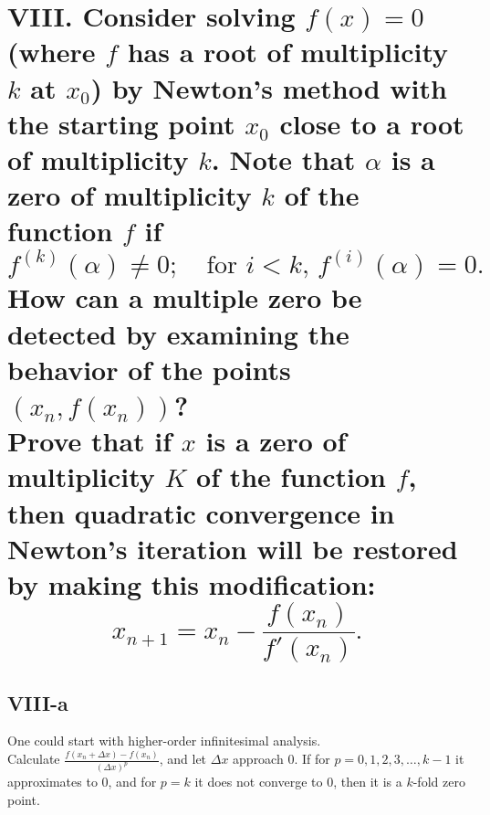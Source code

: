 \documentclass[a4paper]{article}
\begin{document}
\section*{VIII. Consider solving \( f(x) = 0 \) (where \( f \) has a root of multiplicity \( k \) at \( x_0 \)) by Newton's method with the starting point \( x_0 \) close to a root of multiplicity \( k \). Note that \( \alpha \) is a zero of multiplicity \( k \) of the function \( f \) if
\[
f^{(k)}(\alpha) \neq 0; \quad \text{for } i < k, \, f^{(i)}(\alpha) = 0.
\]
How can a multiple zero be detected by examining the behavior of the points \( (x_n, f(x_n)) \)?
\\
Prove that if \( x \) is a zero of multiplicity \( K \) of the function \( f \), then quadratic convergence in Newton's iteration will be restored by making this modification:
\[
x_{n+1} = x_n - \frac{f(x_n)}{f'(x_n)}.
\]
}

\subsection*{VIII-a}
One could start with higher-order infinitesimal analysis.\\
Calculate \( \frac{f(x_n + \Delta x)-f(x_n)}{(\Delta x)^p} \), and let \( \Delta x \) approach 0. If for \( p = 0, 1, 2, 3, \ldots, k-1 \) it approximates to 0, and for \( p = k \) it does not converge to 0, then it is a \( k \)-fold zero point.\\
\end{document}
